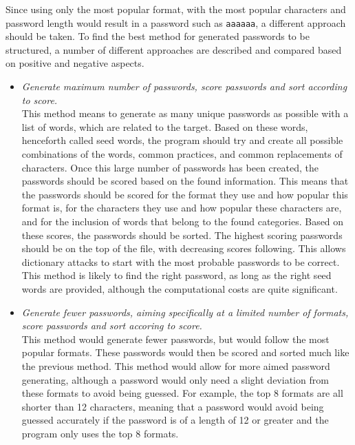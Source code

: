 \documentclass[a4paper,12pt]{article}
\begin{document}
Since using only the most popular format, with the most popular characters and password length would result in a password such as \lstinline{aaaaaa}, a different approach should be taken. To find the best method for generated passwords to be structured, a number of different approaches are described and compared based on positive and negative aspects.

\begin{itemize}
\item \textit{Generate maximum number of passwords, score passwords and sort according to score.}\\
  This method means to generate as many unique passwords as possible with a list of words, which are related to the target. Based on these words, henceforth called seed words, the program should try and create all possible combinations of the words, common practices, and common replacements of characters. Once this large number of passwords has been created, the passwords should be scored based on the found information. This means that the passwords should be scored for the format they use and how popular this format is, for the characters they use and how popular these characters are, and for the inclusion of words that belong to the found categories. Based on these scores, the passwords should be sorted. The highest scoring passwords should be on the top of the file, with decreasing scores following. This allows dictionary attacks to start with the most probable passwords to be correct. This method is likely to find the right password, as long as the right seed words are provided, although the computational costs are quite significant.\\
    
\item \textit{Generate fewer passwords, aiming specifically at a limited number of formats, score passwords and sort accoring to score.}\\
  This method would generate fewer passwords, but would follow the most popular formats. These passwords would then be scored and sorted much like the previous method. This method would allow for more aimed password generating, although a password would only need a slight deviation from these formats to avoid being guessed. For example, the top 8 formats are all shorter than 12 characters, meaning that a password would avoid being guessed accurately if the password is of a length of 12 or greater and the program only uses the top 8 formats.
\end{itemize}
\end{document}
